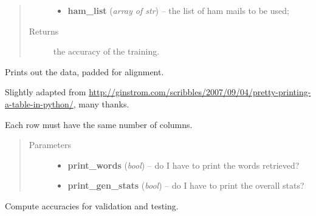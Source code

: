 \documentclass[letterpaper,10pt,english]{sphinxmanual}
\begin{document}
\begin{fulllineitems}
\begin{fulllineitems}
\begin{quote}
\begin{description}
\begin{itemize}
\item {} 
\textbf{ham\_list} (\emph{array of str}) -- the list of ham mails to be used;

\end{itemize}

\item[{Returns}] \leavevmode
the accuracy of the training.

\end{description}\end{quote}

\end{fulllineitems}


\begin{fulllineitems}
\label{index:naive_bayes.Bayes.bayes_print}
Prints out the data, padded for alignment.

Slightly adapted from \href{http://ginstrom.com/scribbles/2007/09/04/pretty-printing-a-table-in-python/}{http://ginstrom.com/scribbles/2007/09/04/pretty-printing-a-table-in-python/}, many thanks.

Each row must have the same number of columns.
\begin{quote}\begin{description}
\item[{Parameters}] \leavevmode\begin{itemize}
\item {} 
\textbf{print\_words} (\emph{bool}) -- do I have to print the words retrieved?

\item {} 
\textbf{print\_gen\_stats} (\emph{bool}) -- do I have to print the overall stats?

\end{itemize}

\end{description}\end{quote}

\end{fulllineitems}


\begin{fulllineitems}
\label{index:naive_bayes.Bayes.check}
Compute accuracies for validation and testing.

\end{fulllineitems}


\end{fulllineitems}
\end{document}
